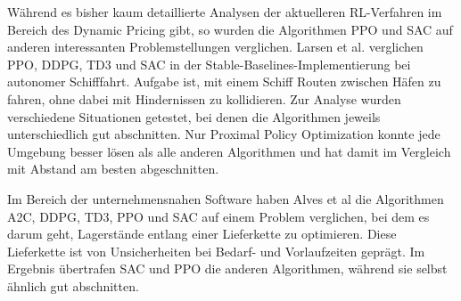 Während es bisher kaum detaillierte Analysen der aktuelleren RL-Verfahren im Bereich des Dynamic Pricing gibt, so wurden die Algorithmen PPO und SAC auf anderen interessanten Problemstellungen verglichen.
Larsen et al. verglichen PPO, DDPG, TD3 und SAC in der Stable-Baselines-Implementierung bei autonomer Schifffahrt.
Aufgabe ist, mit einem Schiff Routen zwischen Häfen zu fahren, ohne dabei mit Hindernissen zu kollidieren.
Zur Analyse wurden verschiedene Situationen getestet, bei denen die Algorithmen jeweils unterschiedlich gut abschnitten.
Nur Proximal Policy Optimization konnte jede Umgebung besser lösen als alle anderen Algorithmen und hat damit im Vergleich mit Abstand am besten abgeschnitten.

Im Bereich der unternehmensnahen Software haben Alves et al \cite{10.1007/978-3-030-87897-9_21} die Algorithmen A2C, DDPG, TD3, PPO und SAC auf einem Problem verglichen, bei dem es darum geht, Lagerstände entlang einer Lieferkette zu optimieren.
Diese Lieferkette ist von Unsicherheiten  bei Bedarf- und Vorlaufzeiten geprägt.
Im Ergebnis übertrafen SAC und PPO die anderen Algorithmen, während sie selbst ähnlich gut abschnitten.